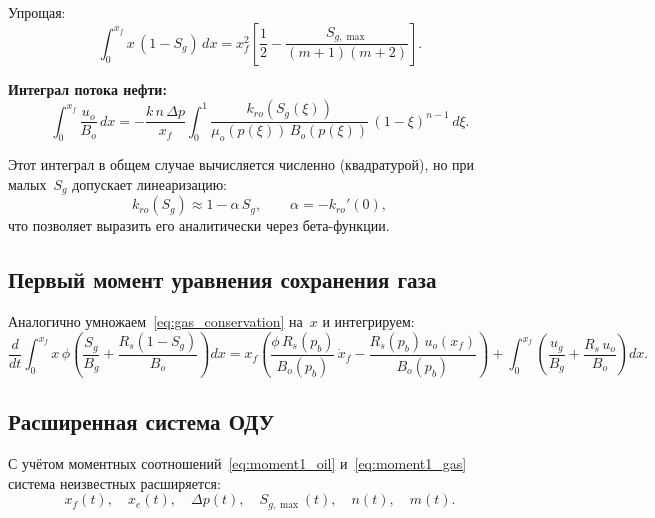 \documentclass[12pt,a4paper]{article}
\begin{document}
Упрощая:
\begin{equation}\label{eq:x_So_integral_simple}
  \int_0^{x_f} x\,(1-S_g)\,dx
  = x_f^2\left[\frac{1}{2}
  - \frac{S_{g,\max}}{(m+1)(m+2)}\right].
\end{equation}

\textbf{Интеграл потока нефти:}
\begin{equation}\label{eq:uo_Bo_integral}
  \int_0^{x_f}\frac{u_o}{B_o}\,dx
  = -\frac{k\,n\,\Delta p}{x_f}
  \int_0^1 \frac{k_{ro}(S_g(\xi))}
  {\mu_o(p(\xi))\,B_o(p(\xi))}\,(1-\xi)^{n-1}\,d\xi.
\end{equation}

Этот интеграл в общем случае вычисляется численно (квадратурой),
но при малых~$S_g$ допускает линеаризацию:
\begin{equation}\label{eq:kro_linearize}
  k_{ro}(S_g) \approx 1 - \alpha\,S_g,
  \qquad \alpha = -k_{ro}'(0),
\end{equation}
что позволяет выразить его аналитически через бета-функции.

\subsection{Первый момент уравнения сохранения газа}

Аналогично умножаем~\eqref{eq:gas_conservation} на~$x$
и интегрируем:
\begin{equation}\label{eq:moment1_gas}
  \boxed{
  \frac{d}{dt}\int_0^{x_f} x\,\phi
  \left(\frac{S_g}{B_g}+\frac{R_s(1-S_g)}{B_o}\right)dx
  = x_f\left(\frac{\phi\,R_s(p_b)}{B_o(p_b)}\,\dot{x}_f
  - \frac{R_s(p_b)\,u_o(x_f)}{B_o(p_b)}\right)
  + \int_0^{x_f}\left(\frac{u_g}{B_g}
  + \frac{R_s\,u_o}{B_o}\right)dx.
  }
\end{equation}

\subsection{Расширенная система ОДУ}

С учётом моментных соотношений~\eqref{eq:moment1_oil}
и~\eqref{eq:moment1_gas} система неизвестных расширяется:
\begin{equation}\label{eq:unknowns_extended}
  x_f(t), \quad x_e(t), \quad \Delta p(t), \quad
  S_{g,\max}(t), \quad n(t), \quad m(t).
\end{equation}
\end{document}
